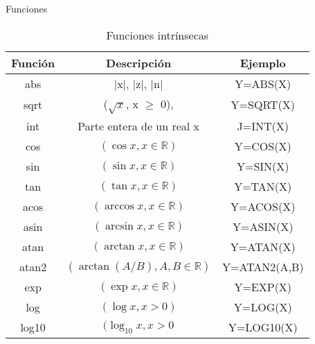 \begin{frame}[fragile]{Funciones} 
    \begin{table}[]
    \centering
    \label{Tabla_funcionesintr1}
    \resizebox{8.75cm}{!} {
    \begin{tabular}{|c|c|c|}
    \hline
    Función              & Descripción                                  & Ejemplo         \\ \hline
    abs                  & |x|, |z|, |n|                                & Y=ABS(X)        \\ \hline
    sqrt                 & ($\sqrt{x}$, x $\geq$ 0),                    & Y=SQRT(X)       \\ \hline
    int                  & Parte entera de un real x                    & J=INT(X)        \\ \hline  
    cos                  & $(\cos x, x \in \mathbb{R})$                 & Y=COS(X)        \\ \hline 
    sin                  & $(\sin x, x \in \mathbb{R})$                 & Y=SIN(X)        \\ \hline 
    tan                  & $(\tan x, x \in \mathbb{R})$                 & Y=TAN(X)        \\ \hline 
    acos                 & $(\arccos x, x \in \mathbb{R})$              & Y=ACOS(X)       \\ \hline 
    asin                 & $(\arcsin x, x \in \mathbb{R})$              & Y=ASIN(X)       \\ \hline 
    atan                 & $(\arctan x, x \in \mathbb{R})$              & Y=ATAN(X)       \\ \hline
    atan2                & $(\arctan (A/B), A, B \in \mathbb{R})$       & Y=ATAN2(A,B)    \\ \hline 
    exp                  & $(\exp x, x \in \mathbb{R})$                 & Y=EXP(X)        \\ \hline 
    log                  & $(\log x, x > 0)$                            & Y=LOG(X)        \\ \hline 
    log10                & $(\log_{10} x, x > 0$                        & Y=LOG10(X)      \\ \hline 
    \end{tabular}}
    \caption*{Funciones intrínsecas}
    \end{table}
\end{frame}

